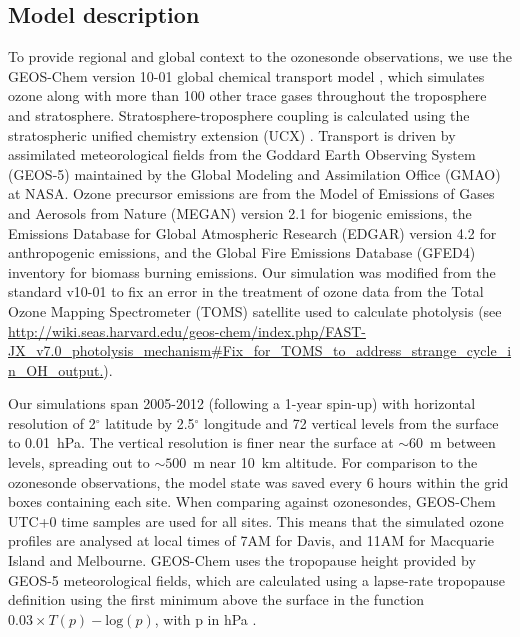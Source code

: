 \documentclass[acp, manuscript]{copernicus} %
\begin{document}
  \subsection{Model description}
    \label{sec:GEOSChemDescription}
    To provide regional and global context to the ozonesonde observations, we use the GEOS-Chem version 10-01 global chemical transport model \citep{Bey2001}, which simulates ozone along with more than 100 other trace gases throughout the troposphere and stratosphere. 
    Stratosphere-troposphere coupling is calculated using the stratospheric unified chemistry extension (UCX) \citep{Eastham2014}.
    Transport is driven by assimilated meteorological fields from the Goddard Earth Observing System (GEOS-5) maintained by the Global Modeling and Assimilation Office (GMAO) at NASA.
    Ozone precursor emissions are from the Model of Emissions of Gases and Aerosols from Nature (MEGAN) version 2.1 \citep{Guenther2012} for biogenic emissions, the Emissions Database for Global Atmospheric Research (EDGAR) version 4.2 for anthropogenic emissions, and the Global Fire Emissions Database (GFED4) inventory \citep{Giglio2013} for biomass burning emissions. 
    Our simulation was modified from the standard v10-01 to fix an error in the treatment of ozone data from the Total Ozone Mapping Spectrometer (TOMS) satellite used to calculate photolysis (see \url{http://wiki.seas.harvard.edu/geos-chem/index.php/FAST-JX_v7.0_photolysis_mechanism#Fix_for_TOMS_to_address_strange_cycle_in_OH_output.}).  

    Our simulations span 2005-2012 (following a 1-year spin-up) with horizontal resolution of 2$^{\circ}$ latitude by 2.5$^{\circ}$ longitude and 72 vertical levels from the surface to 0.01~hPa.
    The vertical resolution is finer near the surface at $\sim 60$~m between levels, spreading out to $\sim 500$~m near 10~km altitude.
    For comparison to the ozonesonde observations, the model state was saved every 6 hours within the grid boxes containing each site.
    When comparing against ozonesondes, GEOS-Chem UTC+0 time samples are used for all sites.
    This means that the simulated ozone profiles are analysed at local times of 7AM for Davis, and 11AM for Macquarie Island and Melbourne.
    GEOS-Chem uses the tropopause height provided by GEOS-5 meteorological fields, which are calculated using a lapse-rate tropopause definition using the first minimum above the surface in the function $0.03 \times T(p) - \mathrm{log}(p)$, with p in hPa \citep{Rienecker2008}.
\end{document}
